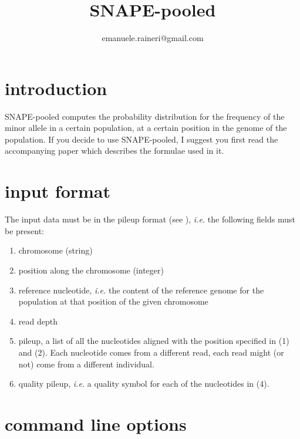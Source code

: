 \documentclass{report}
\newcommand{\tmem}[1]{{\em #1\/}}
\newenvironment{enumeratenumeric}{\begin{enumerate}[1.] }{\end{enumerate}}
\begin{document}
\title{SNAPE-pooled}\author{emanuele.raineri@gmail.com}
\maketitle

\section{introduction}

SNAPE-pooled computes the probability distribution for the frequency of the
minor allele in a certain population, at a certain position in the genome of
the population. If you decide to use SNAPE-pooled, I suggest you first read the
accompanying paper which describes the formulae used in it.

\section{input format}

The input data must be in the pileup format 
(see {\color{blue}{http://samtools.sourceforge.net/pileup.shtml}}),
{\tmem{i.e.}} the following fields must be present:


\begin{enumeratenumeric}
  \item chromosome (string) 
  
  \item position along the chromosome (integer)
  
  \item reference nucleotide, {\tmem{i.e.}} the content of the reference
  genome for the population at that position of the given chromosome
  
  \item read depth
  
  \item pileup, a list of all the nucleotides aligned with the position
  specified in (1) and (2). Each nucleotide comes from a different read, each
  read might (or not) come from a different individual.
  
  \item quality pileup, {\tmem{i.e.}}  a quality symbol for each of the
  nucleotides in (4).
  
  
\end{enumeratenumeric}

\section{command line options}
\end{document}
